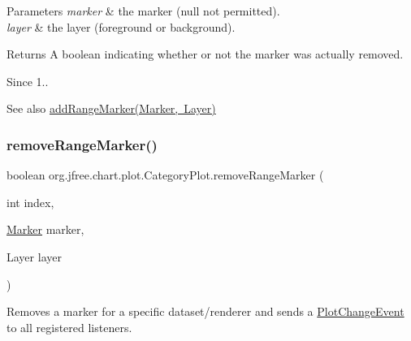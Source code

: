 \begin{DoxyParams}{Parameters}
{\em marker} & the marker ({\ttfamily null} not permitted). \\
\hline
{\em layer} & the layer (foreground or background).\\
\hline
\end{DoxyParams}
\begin{DoxyReturn}{Returns}
A boolean indicating whether or not the marker was actually removed.
\end{DoxyReturn}
\begin{DoxySince}{Since}
1..
\end{DoxySince}
\begin{DoxySeeAlso}{See also}
\mbox{\hyperlink{classorg_1_1jfree_1_1chart_1_1plot_1_1_category_plot_a231e8e9773d07ab24d15452adf8bea19}{add\+Range\+Marker(\+Marker, Layer)}} 
\end{DoxySeeAlso}
\mbox{\label{classorg_1_1jfree_1_1chart_1_1plot_1_1_category_plot_a293cfdd6b99805f122432bfc93a4d3f9}} 
\subsubsection{\texorpdfstring{remove\+Range\+Marker()}{removeRangeMarker()}\hspace{0.1cm}{\footnotesize\ttfamily [3/4]}}
{\footnotesize\ttfamily boolean org.\+jfree.\+chart.\+plot.\+Category\+Plot.\+remove\+Range\+Marker (\begin{DoxyParamCaption}\item[{int}]{index,  }\item[{\mbox{\hyperlink{classorg_1_1jfree_1_1chart_1_1plot_1_1_marker}{Marker}}}]{marker,  }\item[{Layer}]{layer }\end{DoxyParamCaption})}

Removes a marker for a specific dataset/renderer and sends a \mbox{\hyperlink{}{Plot\+Change\+Event}} to all registered listeners.


